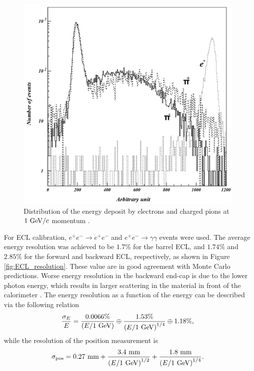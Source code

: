 \begin{figure}[H]
	\centering
	\captionsetup{width=0.8\linewidth}
	\includegraphics[width=0.6\linewidth]{fig/setup/ECL_deposit}
	\caption{Distribution of the energy deposit by electrons and charged pions at $1\mathrm{~GeV}/c$ momentum \cite{ABASHIAN2002117}.}
	\label{fig:ECL_deposit}
\end{figure}

For ECL calibration, $e^+e^- \to e^+e^-$ and $e^+e^- \to \gamma\gamma$ events were used. The average energy resolution was achieved to be $1.7\%$ for the barrel ECL, and $1.74\%$ and $2.85\%$ for the forward and backward ECL, respectively, as shown in Figure \ref{fig:ECL_resolution}. These value are in good agreement with Monte Carlo predictions. Worse energy resolution in the backward end-cap is due to the lower photon energy, which results in larger scattering in the material in front of the calorimeter \cite{haba2004letter}. The energy resolution as a function of the energy can be described via the following relation
\begin{equation}
\frac{\sigma_E}{E} = \frac{0.0066\%}{\left(E/1\mathrm{~GeV}\right)}\oplus\frac{1.53\%}{\left( E/1\mathrm{~GeV}\right)^{1/4}}\oplus 1.18\%,
\end{equation}
while the resolution of the position measurement is
\begin{equation}
\sigma_{\mathrm{pos}} = 0.27\mathrm{~mm}+\frac{3.4\mathrm{~mm}}{\left( E/1\mathrm{~GeV}\right)^{1/2}} + \frac{1.8\mathrm{~mm}}{\left( E/1\mathrm{~GeV}\right)^{1/4}}.
\end{equation}

